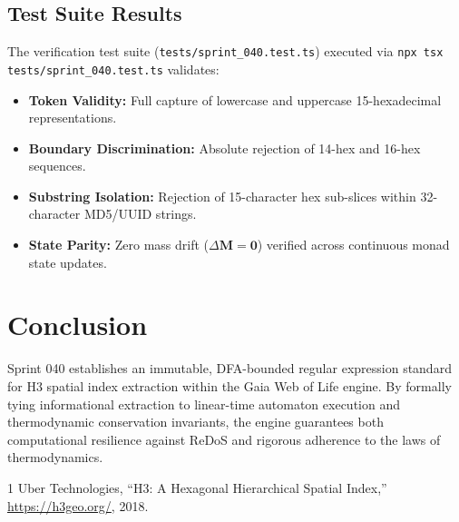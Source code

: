 \documentclass[10pt,journal,compsoc]{IEEEtran}
\begin{document}
\subsection{Test Suite Results}
The verification test suite (\texttt{tests/sprint\_040.test.ts}) executed via \texttt{npx tsx tests/sprint\_040.test.ts} validates:
\begin{itemize}
    \item \textbf{Token Validity:} Full capture of lowercase and uppercase 15-hexadecimal representations.
    \item \textbf{Boundary Discrimination:} Absolute rejection of 14-hex and 16-hex sequences.
    \item \textbf{Substring Isolation:} Rejection of 15-character hex sub-slices within 32-character MD5/UUID strings.
    \item \textbf{State Parity:} Zero mass drift ($\Delta \mathbf{M} = \mathbf{0}$) verified across continuous monad state updates.
\end{itemize}

\section{Conclusion}
Sprint 040 establishes an immutable, DFA-bounded regular expression standard for H3 spatial index extraction within the Gaia Web of Life engine. By formally tying informational extraction to linear-time automaton execution and thermodynamic conservation invariants, the engine guarantees both computational resilience against ReDoS and rigorous adherence to the laws of thermodynamics.


\begin{thebibliography}{1}
Uber Technologies, ``H3: A Hexagonal Hierarchical Spatial Index,'' \url{https://h3geo.org/}, 2018.
\end{thebibliography}
\end{document}
